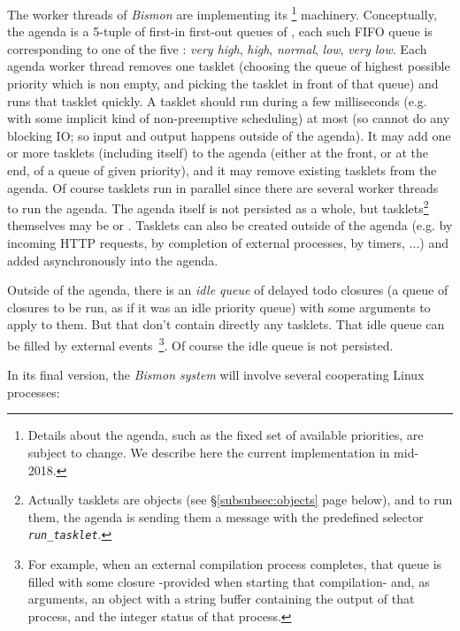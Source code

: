 The worker threads of \emph{Bismon} are implementing its
 \footnote{Details about the agenda,
  such as the fixed set of available priorities, are subject to
  change. We describe here the current implementation in mid-2018.}
machinery. Conceptually, the agenda is a 5-tuple of first-in first-out
queues of , each such FIFO queue is
corresponding to one of the five  :
\emph{very high}, \emph{high}, \emph{normal}, \emph{low}, \emph{very
  low}. Each agenda worker thread removes one tasklet (choosing the
queue of highest possible priority which is non empty, and picking the
tasklet in front of that queue) and runs that tasklet quickly. A
tasklet should run during a few milliseconds (e.g. with some implicit
kind of non-preemptive scheduling) at most (so cannot do any blocking
IO; so input and output happens outside of the agenda). It may add one
or more tasklets (including itself) to the agenda (either at the
front, or at the end, of a queue of given priority), and it may remove
existing tasklets from the agenda. Of course tasklets run in parallel
since there are several worker threads to run the agenda. The agenda
itself is not persisted as a whole, but tasklets\footnote{Actually
  tasklets are objects (see \S\ref{subsubsec:objects} page
  \pageref{subsubsec:objects} below), and to run them, the agenda is
  sending them a message with the predefined selector
  \texttt{\emph{run\_tasklet}}.}  themselves may be
 or .
Tasklets can also be created outside of the agenda (e.g. by incoming
HTTP requests, by completion of external processes, by timers, ...)
and added asynchronously into the agenda.

Outside of the agenda, there is an \emph{idle queue} of delayed todo
closures (a queue of closures to be run, as if it was an idle priority
queue) with some arguments to apply to them. But that  don't contain directly any tasklets. That idle
queue can be filled by external events~\footnote{For example, when an
  external compilation process completes, that queue is filled with
  some closure -provided when starting that compilation- and, as
  arguments, an object with a string buffer containing the output of
  that process, and the integer status of that process.}. Of course the idle
queue is not persisted.

\bigskip

In its final version, the \emph{Bismon system} will involve several
cooperating Linux processes:


